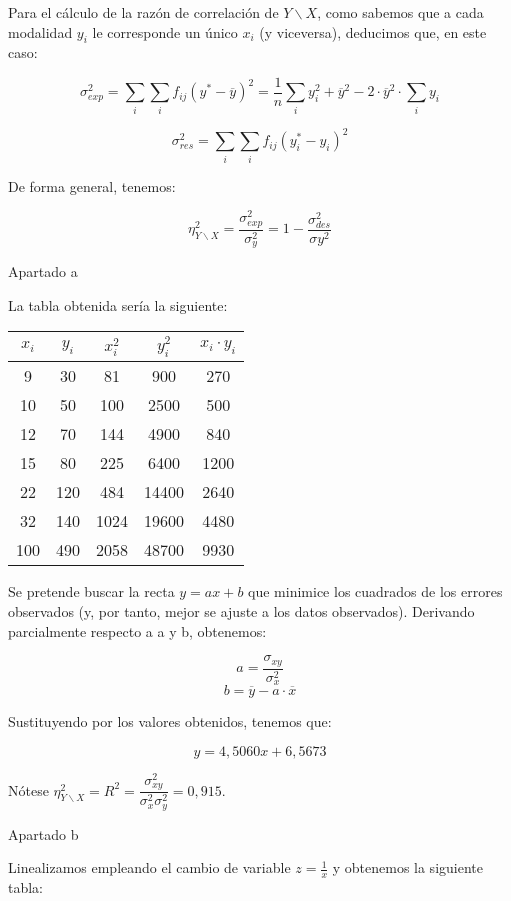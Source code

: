 Para el cálculo de la razón de correlación de $Y\backslash X$, como sabemos que a cada modalidad $y_i$ le corresponde un único $x_i$ (y viceversa), deducimos que, en este caso:

$$\sigma_{exp}^2 = \sum_{i}\sum_{i}f_{ij}(y^*-\overline{y})^2 = \frac{1}{n}\sum_{i}y_i^2 + \overline y^2 - 2·\overline y^2·\sum_{i}y_i$$

$$\sigma_{res}^2 = \sum_{i}\sum_{i}f_{ij}(y_i^*-y_i)^2$$

De forma general, tenemos:

$$\eta_{Y\backslash X}^2 = \frac{\sigma_{exp}^2}{\sigma_{y}^2} = 1 - \frac{\sigma_{des}^2}{\sigma{y}^2}$$

Apartado a

La tabla obtenida sería la siguiente: 

\begin{center}
	\begin{tabular}{ c|c|c|c|c }
	
	$x_i$ & $y_i$ & $x_i^2$ & $y_i^2$ & $x_i·y_i$ \\ \hline
	9 & 30 & 81 & 900 & 270 \\ 
	10 & 50 & 100 & 2500 & 500 \\ 
	12 & 70 & 144 & 4900 & 840 \\ 
	15 & 80 & 225 & 6400 & 1200 \\ 
	22 & 120 & 484 & 14400 & 2640 \\ 
	32 & 140 & 1024 & 19600 & 4480 \\ \hline
	100 & 490 & 2058 & 48700 & 9930 \\ 
\end{tabular}
\end{center}

Se pretende buscar la recta $y = ax + b$ que minimice los cuadrados de los errores observados (y, por tanto, mejor se ajuste a los datos observados). Derivando parcialmente respecto a a y b, obtenemos: 

$$a = \frac{\sigma_{xy}}{\sigma_x^2}$$
$$b = \overline{y} - a·\overline{x}$$

Sustituyendo por los valores obtenidos, tenemos que:

$$y=4,5060x+6,5673$$

Nótese $\eta_{Y\backslash X}^2 = R^2 = \dfrac{\sigma_{xy}^2}{\sigma_x^2\sigma_y^2}=0,915$.

Apartado b

Linealizamos empleando el cambio de variable $z=\frac{1}{x}$ y obtenemos la siguiente tabla: 

